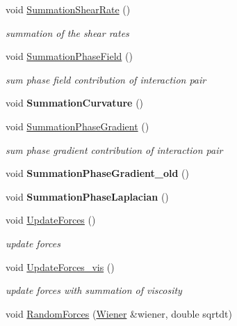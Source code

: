 \begin{CompactItemize}
void \hyperlink{classInteraction_98a1dd36fd34e7646aec02e21426562d}{SummationShearRate} ()
\begin{CompactList}\small\item\em summation of the shear rates \item\end{CompactList}\item 
void \hyperlink{classInteraction_6c0000b8eaede20c1d3576013195d71f}{SummationPhaseField} ()
\begin{CompactList}\small\item\em sum phase field contribution of interaction pair \item\end{CompactList}\item 
\hypertarget{classInteraction_e12db5ebc1b5b49de8024073062c7d2d}{
void \textbf{SummationCurvature} ()}
\label{classInteraction_e12db5ebc1b5b49de8024073062c7d2d}

\item 
void \hyperlink{classInteraction_28d4a91b7bbf8a430474ff0659d61d2d}{SummationPhaseGradient} ()
\begin{CompactList}\small\item\em sum phase gradient contribution of interaction pair \item\end{CompactList}\item 
\hypertarget{classInteraction_30a4bcf8e6ba5372a5ccfa2eb5f0c599}{
void \textbf{SummationPhaseGradient\_\-old} ()}
\label{classInteraction_30a4bcf8e6ba5372a5ccfa2eb5f0c599}

\item 
\hypertarget{classInteraction_f0fbe6eae076e7416deebbfce35e2652}{
void \textbf{SummationPhaseLaplacian} ()}
\label{classInteraction_f0fbe6eae076e7416deebbfce35e2652}

\item 
void \hyperlink{classInteraction_7d1b68aea03829678cfbe8c5ec3acc2a}{UpdateForces} ()
\begin{CompactList}\small\item\em update forces \item\end{CompactList}\item 
void \hyperlink{classInteraction_4cfd21ed44349e4295fd70e98bdae381}{UpdateForces\_\-vis} ()
\begin{CompactList}\small\item\em update forces with summation of viscosity \item\end{CompactList}\item 
\hypertarget{classInteraction_25763a827f24b2b073c564f274b0ae47}{
void \hyperlink{classInteraction_25763a827f24b2b073c564f274b0ae47}{RandomForces} (\hyperlink{classWiener}{Wiener} \&wiener, double sqrtdt)}
\label{classInteraction_25763a827f24b2b073c564f274b0ae47}


\end{CompactItemize}
